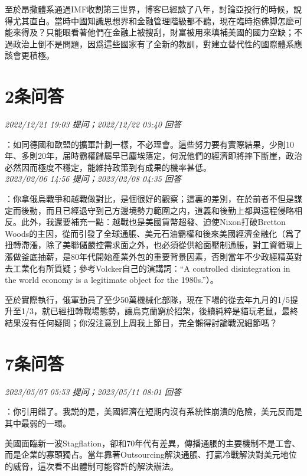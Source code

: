 \documentclass[twocolumn]{ctexart}
\begin{document}
至於昂撒體系通過IMF收割第三世界，博客已經談了八年，討論亞投行的時候，說得尤其直白。當時中國知識思想界和金融管理階級都不聽，現在臨時抱佛脚怎麽可能來得及？只能眼看著他們在金融上被搜刮，財富被用來填補美國的國力空缺；不過政治上倒不是問題，因爲這些國家有了全新的教訓，對建立替代性的國際體系應該會更積極。
\\

\section{2条问答}

\textit{\hfill\noindent\small 2022/12/21 19:03 提问；2022/12/22 03:40 回答}

：如同德國和歐盟的擴軍計劃一樣，不必理會。這些努力要有實際結果，少則10年、多則20年，届時霸權歸屬早已塵埃落定，何況他們的經濟即將摔下斷崖，政治必然因而極度不穩定，能維持政策到有成果的機率甚低。
\\

\textit{\hfill\noindent\small 2023/02/06 14:56 提问；2023/02/08 04:35 回答}

：你拿俄烏戰爭和越戰做對比，是個很好的觀察；這裏的差別，在於前者不但是謀定而後動，而且已經退守到己方邊境勢力範圍之内，道義和後勤上都與遠程侵略相反。此外，我還要補充一點：越戰也是美國貨幣超發、迫使Nixon打破Bretton Woods的主因，從而引發了全球通脹、美元石油霸權和後來美國經濟金融化（爲了扭轉滯漲，除了美聯儲嚴控需求面之外，也必須從供給面壓制通脹，對工資循環上漲做釜底抽薪，是80年代開始產業外包的重要背景因素，否則當年不少政經精英對去工業化有所質疑；參考Volcker自己的演講詞：“A controlled disintegration in the world economy is a legitimate object for the 1980s.”）。

至於實際執行，俄軍動員了至少50萬機械化部隊，現在下場的從去年九月的1/5提升至1/3，就已經扭轉戰場態勢，讓烏克蘭窮於招架，後續純粹是貓玩老鼠，最終結果沒有任何疑問；你沒注意到上周我上節目，完全懶得討論戰況細節嗎？
\\

\section{7条问答}

\textit{\hfill\noindent\small 2023/05/07 05:53 提问；2023/05/11 08:01 回答}

：你引用錯了。我説的是，美國經濟在短期内沒有系統性崩潰的危險，美元反而是其中最弱的一環。

美國面臨新一波Stagflation，卻和70年代有差異，傳播通脹的主要機制不是工會、而是企業的寡頭獨占。當年靠著Outsourcing解決通脹、打贏冷戰解決對美元地位的威脅，這次看不出體制可能容許的解決辦法。
\\
\end{document}
